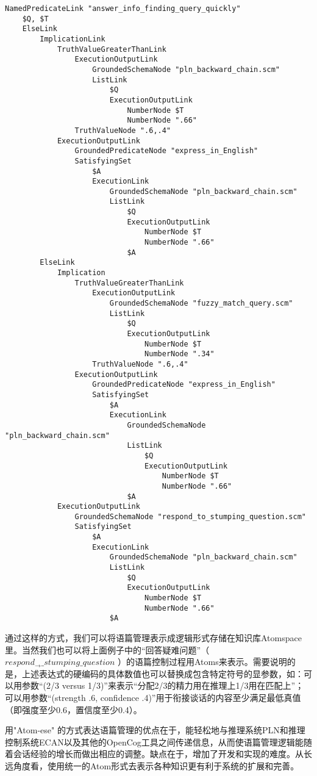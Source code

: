 {\tt\begin{tiny}\begin{lstlisting}
NamedPredicateLink "answer_info_finding_query_quickly"
	$Q, $T
	ElseLink
		ImplicationLink
			TruthValueGreaterThanLink
				ExecutionOutputLink
					GroundedSchemaNode "pln_backward_chain.scm"
					ListLink
						$Q
						ExecutionOutputLink
							NumberNode $T
							NumberNode ".66"
				TruthValueNode ".6,.4"			
			ExecutionOutputLink
				GroundedPredicateNode "express_in_English"
				SatisfyingSet
					$A
					ExecutionLink
						GroundedSchemaNode "pln_backward_chain.scm"
						ListLink
							$Q
							ExecutionOutputLink
								NumberNode $T
								NumberNode ".66"
							$A				
		ElseLink
			Implication
				TruthValueGreaterThanLink
					ExecutionOutputLink
						GroundedSchemaNode "fuzzy_match_query.scm"
						ListLink
							$Q
							ExecutionOutputLink
								NumberNode $T
								NumberNode ".34"
					TruthValueNode ".6,.4"
				ExecutionOutputLink
					GroundedPredicateNode "express_in_English"
					SatisfyingSet
						$A
						ExecutionLink
							GroundedSchemaNode "pln_backward_chain.scm"
							ListLink
								$Q
								ExecutionOutputLink
									NumberNode $T
									NumberNode ".66"
							$A		
			ExecutionOutputLink
				GroundedSchemaNode "respond_to_stumping_question.scm"
				SatisfyingSet
					$A
					ExecutionLink
						GroundedSchemaNode "pln_backward_chain.scm"
						ListLink
							$Q
							ExecutionOutputLink
								NumberNode $T
								NumberNode ".66"
						$A	
\end{lstlisting}\end{tiny}}	

\noindent 通过这样的方式，我们可以将语篇管理表示成逻辑形式存储在知识库Atomspace里。当然我们也可以将上面例子中的“回答疑难问题”（$respond_\to\_stumping\_question$ ）的语篇控制过程用Atoms来表示。需要说明的是，上述表达式的硬编码的具体数值也可以替换成包含特定符号的显参数，如：可以用参数“(2/3 versus 1/3)”来表示“分配2/3的精力用在推理上1/3用在匹配上”； 可以用参数“(strength .6, confidence .4)”用于衔接谈话的内容至少满足最低真值（即强度至少0.6，置信度至少0.4）。

用"Atom-ese" 的方式表达语篇管理的优点在于，能轻松地与推理系统PLN和推理控制系统ECAN以及其他的OpenCog工具之间传递信息，从而使语篇管理逻辑能随着会话经验的增长而做出相应的调整。缺点在于，增加了开发和实现的难度。从长远角度看，使用统一的Atom形式去表示各种知识更有利于系统的扩展和完善。


